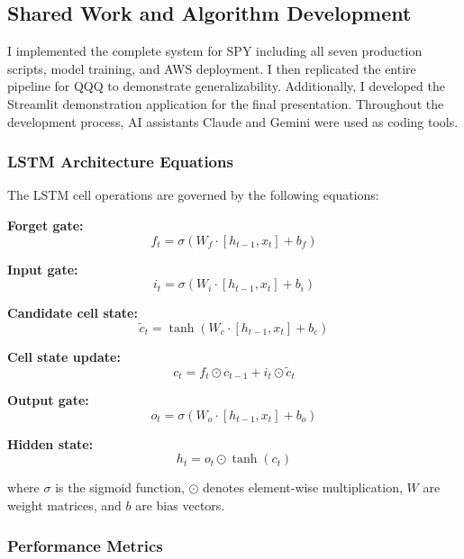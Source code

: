 \documentclass[12pt,letterpaper]{article}
\begin{document}
\subsection{Shared Work and Algorithm Development}

I implemented the complete system for SPY including all seven production scripts, model training, and AWS deployment. I then replicated the entire pipeline for QQQ to demonstrate generalizability. Additionally, I developed the Streamlit demonstration application for the final presentation. Throughout the development process, AI assistants Claude and Gemini were used as coding tools.

\subsubsection{LSTM Architecture Equations}

The LSTM cell operations are governed by the following equations:

\textbf{Forget gate:}
\begin{equation}
f_t = \sigma(W_f \cdot [h_{t-1}, x_t] + b_f)
\end{equation}

\textbf{Input gate:}
\begin{equation}
i_t = \sigma(W_i \cdot [h_{t-1}, x_t] + b_i)
\end{equation}

\textbf{Candidate cell state:}
\begin{equation}
\tilde{c}_t = \tanh(W_c \cdot [h_{t-1}, x_t] + b_c)
\end{equation}

\textbf{Cell state update:}
\begin{equation}
c_t = f_t \odot c_{t-1} + i_t \odot \tilde{c}_t
\end{equation}

\textbf{Output gate:}
\begin{equation}
o_t = \sigma(W_o \cdot [h_{t-1}, x_t] + b_o)
\end{equation}

\textbf{Hidden state:}
\begin{equation}
h_t = o_t \odot \tanh(c_t)
\end{equation}

where $\sigma$ is the sigmoid function, $\odot$ denotes element-wise multiplication, $W$ are weight matrices, and $b$ are bias vectors.

\subsubsection{Performance Metrics}
\end{document}
